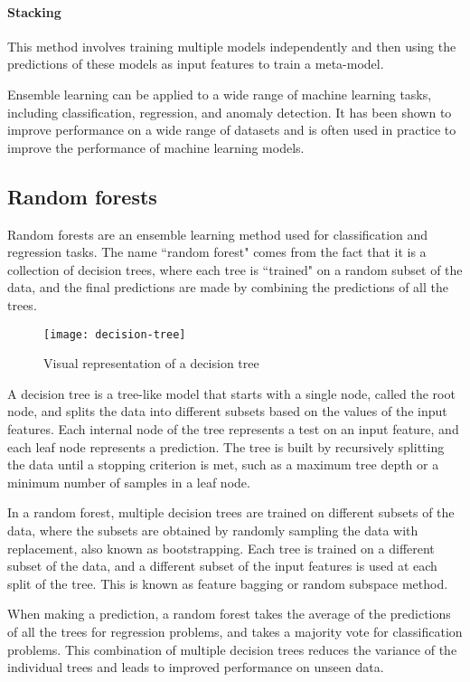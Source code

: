 \paragraph{Stacking} This method involves training multiple models independently and then using the predictions of these models as input features to train a meta-model.

Ensemble learning can be applied to a wide range of machine learning tasks, including classification, regression, and anomaly detection. 
It has been shown to improve performance on a wide range of datasets and is often used in practice to improve the performance of machine learning models.


\subsection{Random forests}

Random forests \cite{breiman2001random, charles2020random} are an ensemble learning method used for classification and regression tasks. 
The name ``random forest" comes from the fact that it is a collection of decision trees, where each tree is ``trained" on a random subset of the data, and the final predictions are made by combining the predictions of all the trees.

\begin{figure}[H]
  \centering
  \texttt{[image: decision-tree]}
  \caption{Visual representation of a decision tree \cite{scikit}}
\end{figure}

A decision tree is a tree-like model that starts with a single node, called the root node, and splits the data into different subsets based on the values of the input features.
Each internal node of the tree represents a test on an input feature, and each leaf node represents a prediction.
The tree is built by recursively splitting the data until a stopping criterion is met, such as a maximum tree depth or a minimum number of samples in a leaf node.

In a random forest, multiple decision trees are trained on different subsets of the data, where the subsets are obtained by randomly sampling the data with replacement, also known as bootstrapping.
Each tree is trained on a different subset of the data, and a different subset of the input features is used at each split of the tree. 
This is known as feature bagging or random subspace method.

When making a prediction, a random forest takes the average of the predictions of all the trees for regression problems, and takes a majority vote for classification problems.
This combination of multiple decision trees reduces the variance of the individual trees and leads to improved performance on unseen data.

